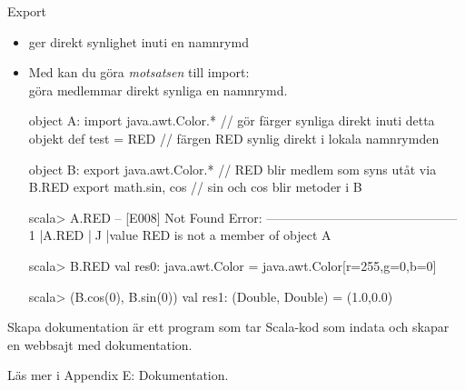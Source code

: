 \begin{Slide}{Export}
\begin{itemize}\SlideFontSmall
  \item {} ger direkt synlighet  inuti en namnrymd
  \item Med  kan du göra \emph{motsatsen} till import: \\
göra medlemmar direkt synliga  en namnrymd.
\begin{CodeSmall}
object A:
  import java.awt.Color.* // gör färger synliga direkt inuti detta objekt
  def test = RED          // färgen RED synlig direkt i lokala namnrymden

object B:
  export java.awt.Color.* // RED blir medlem som syns utåt via B.RED
  export math.{sin, cos}  // sin och cos blir metoder i B
\end{CodeSmall}

\begin{REPLsmall}
scala> A.RED
-- [E008] Not Found Error: ---------------------------------------------
1 |A.RED
  |^^^^^
  |value RED is not a member of object A

scala> B.RED
val res0: java.awt.Color = java.awt.Color[r=255,g=0,b=0]

scala> (B.cos(0), B.sin(0))
val res1: (Double, Double) = (1.0,0.0)
\end{REPLsmall}
\end{itemize}

\end{Slide}


\begin{Slide}{Skapa dokumentation}
 är ett program som tar Scala-kod som indata och skapar en webbsajt med dokumentation.

\vspace{2em}

\vspace*{1em}Läs mer i Appendix E: Dokumentation.
\end{Slide}

